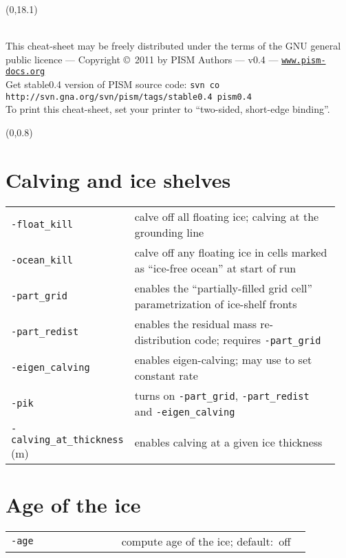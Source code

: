 \documentclass[landscape]{article}
\newcommand{\PISMDOWNLOADMSG}{Get stable0.4 version of PISM source code: \texttt{svn co http://svn.gna.org/svn/pism/tags/stable0.4 pism0.4}}
\begin{document}
\null\newpage
\begin{textblock}{47}(0,18.1)
  \begin{center}
    \hrulefill\\
    This cheat-sheet may be freely distributed under the terms of the GNU general
    public licence --- Copyright \copyright\ 2011 by PISM Authors --- v0.4 ---
    \href{http://www.pism-docs.org}{\texttt{www.pism-docs.org}}\\
    \PISMDOWNLOADMSG\\
    To print this cheat-sheet, set your printer to ``two-sided, short-edge binding''.
 \end{center}
\end{textblock}

\begin{textblock}{15}(0,0.8)

\section{Calving and ice shelves}
\label{sec:calving}
\begin{tabular}{@{}p{0.3\linewidth}p{0.65\linewidth}@{}}
  \texttt{-float_kill} & calve off all floating ice; calving at the grounding
  line\\
\texttt{-ocean_kill} & calve off any floating ice in cells marked as ``ice-free
ocean'' at start of run\\
\texttt{-part_grid} & enables the ``partially-filled grid cell''
parametrization of ice-shelf fronts\\
\texttt{-part_redist} & enables the residual mass re-distribution code; requires \texttt{-part_grid}\\
\texttt{-eigen_calving} & enables eigen-calving; may use to set constant rate \\
\texttt{-pik} & turns on \texttt{-part_grid}, \texttt{-part_redist} and
\texttt{-eigen_calving}\\
\texttt{-calving_at_thickness} (m) & enables calving at a given ice thickness\\
\end{tabular}

\section{Age of the ice}
\label{sec:age}
\begin{tabular}{@{}p{0.35\linewidth}p{0.6\linewidth}@{}}
\texttt{-age} & compute age of the ice; \mbox{default: off}\\
\end{tabular}


\end{textblock}
\end{document}
